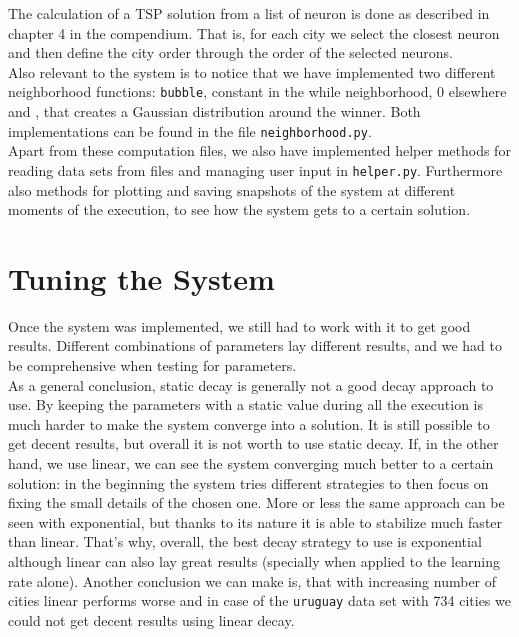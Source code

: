 \documentclass[11pt]{article}
\begin{document}
The calculation of a TSP solution from a list of neuron is done as described in
chapter 4 in the compendium. That is, for each city we select the closest neuron
and then define the city order through the order of the selected neurons.\\

Also relevant to the system is to notice that we have implemented two different
neighborhood functions: \texttt{bubble}, constant in the while neighborhood, 0
elsewhere and , that creates a Gaussian distribution around the
winner. Both implementations can be found in the file
\texttt{neighborhood.py}.\\

Apart from these computation files, we also have implemented helper methods for
reading data sets from files and managing user input  in \texttt{helper.py}.
Furthermore also methods for plotting and saving snapshots of the system at
different moments of the execution, to see how the system gets to a certain
solution.\\


\section{Tuning the System}

Once the system was implemented, we still had to work with it to get good
results. Different combinations of parameters lay different results,
and we had to be comprehensive when testing for parameters.\\

As a general conclusion, static decay is generally not a good decay approach to
use. By keeping the parameters with a static value during all the execution is
much harder to make the system converge into a solution. It is still possible to
get decent results, but overall it is not worth to use static decay. If, in the
other hand, we use linear, we can see the system converging much better to a
certain solution: in the beginning the system tries different strategies to then
focus on fixing the small details of the chosen one. More or less the same
approach can be seen with exponential, but thanks to its nature it is able to
stabilize much faster than linear. That's why, overall, the best decay strategy
to use is exponential although linear can also lay great results (specially when
applied to the learning rate alone). Another conclusion we can make is, that
with increasing number of cities linear performs worse and in case of the
\texttt{uruguay} data set with 734 cities we could not get decent results using
linear decay.\\
\end{document}
